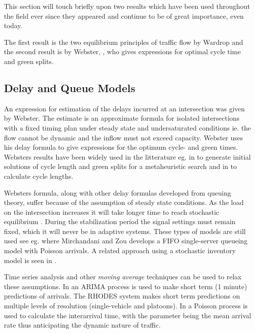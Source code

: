 \label{sec:history}

This section will touch briefly upon two results which have been used
throughout the field ever since they appeared and continue to be of
great importance, even today.

The first result is the two equilibrium principles of traffic flow by
Wardrop \cite{Wardrop} and the second result is by Webster,
\cite{Webster}, who gives expressions for optimal cycle time and green
splits.

\subsection{Delay and Queue Models}
\label{sec:webster}

An expression for estimation of the delays incurred at an intersection
was given by Webster. The estimate is an approximate formula for
isolated intersections with a fixed timing plan under steady state and
undersaturated conditions ie. the flow cannot be dynamic and the
inflow must not exceed capacity.  Webster uses his delay formula to
give expressions for the optimum cycle- and green times.  Websters
results have been widely used in the litterature eg. in \cite{1} to
generate initial solutions of cycle length and green splits for a
metaheuristic search and in \cite{30} to calculate cycle lengths.

Websters formula, along with other delay formulas developed from
queuing theory, suffer because of the assumption of steady state
conditions. As the load on the intersection increases it will take
longer time to reach stochastic equilibrium
\cite{traffictheory}. During the stabilization period the signal
settings must remain fixed, which it will never be in adaptive
systems. These types of models are still used see eg. \cite{38} where
Mirchandani and Zou develops a FIFO single-server queueing model with
Poisson arrivals. A related approach using a stochastic inventory
model is seen in \cite{10}.

Time series analysis and other \textit{moving average} techniques can
be used to relax these assumptions. In \cite{shortpredict} an ARIMA
process is used to make short term (1 minute) predictions of
arrivals. The RHODES system \cite{44} makes short term predictions on
multiple levels of resolution (single-vehicle and platoons). In
\cite{1} a Poisson process is used to calculate the interarrival time,
with the parameter being the mean arrival rate thus anticipating the
dynamic nature of traffic.

